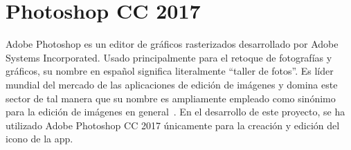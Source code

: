 \section{Photoshop CC 2017}
Adobe Photoshop es un editor de gráficos rasterizados desarrollado por Adobe Systems Incorporated. Usado principalmente para el retoque de fotografías y gráficos, su nombre en español significa literalmente ``taller de fotos''. Es líder mundial del mercado de las aplicaciones de edición de imágenes y domina este sector de tal manera que su nombre es ampliamente empleado como sinónimo para la edición de imágenes en general~\cite{wiki:adobephotoshop}. 
En el desarrollo de este proyecto, se ha utilizado Adobe Photoshop CC 2017 únicamente para la creación y edición del icono de la app.
